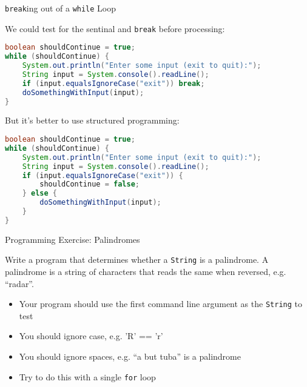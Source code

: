 \documentclass{beamer}
\begin{document}
\begin{frame}[fragile]{{\tt break}ing out of a {\tt while} Loop}

\vspace{-.05in}
We could test for the sentinal and {\tt break} before processing:
\vspace{-.05in}
\begin{lstlisting}[language=Java]
boolean shouldContinue = true;
while (shouldContinue) {
    System.out.println("Enter some input (exit to quit):");
    String input = System.console().readLine();
    if (input.equalsIgnoreCase("exit")) break;
    doSomethingWithInput(input);
}
\end{lstlisting}
\vspace{-.1in}
But it's better to use structured programming:
\vspace{-.05in}
\begin{lstlisting}[language=Java]
boolean shouldContinue = true;
while (shouldContinue) {
    System.out.println("Enter some input (exit to quit):");
    String input = System.console().readLine();
    if (input.equalsIgnoreCase("exit")) {
        shouldContinue = false;
    } else {
        doSomethingWithInput(input);
    }
}
\end{lstlisting}


\end{frame}

\begin{frame}[fragile]{Programming Exercise: Palindromes}

Write a program that determines whether a {\tt String} is a palindrome.  A palindrome is a string of characters that reads the same when reversed, e.g. ``radar''.
\begin{itemize}
\item Your program should use the first command line argument as the {\tt String} to test
\item You should ignore case, e.g. 'R' == 'r'
\item You should ignore spaces, e.g. ``a but tuba'' is a palindrome
\item Try to do this with a single {\tt for} loop
\end{itemize}


\end{frame}
\end{document}
